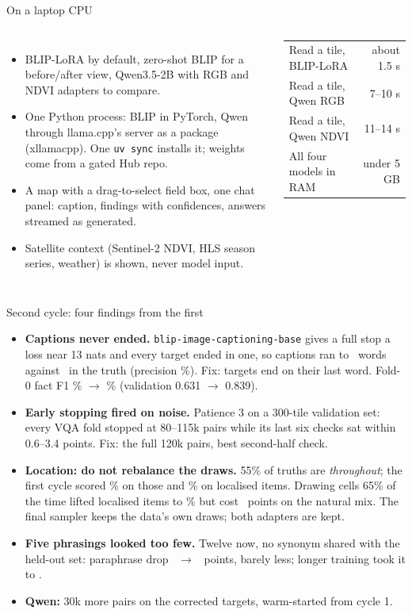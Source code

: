 \documentclass[aspectratio=169,10pt,t]{beamer}
\begin{document}
\begin{frame}{On a laptop CPU}
\begin{columns}[T]
\begin{itemize}
\item BLIP-LoRA by default, zero-shot BLIP for a before/after view, Qwen3.5-2B with RGB and NDVI adapters to compare.
\item One Python process: BLIP in PyTorch, Qwen through llama.cpp's server as a package (xllamacpp). One \texttt{uv sync} installs it; weights come from a gated Hub repo.
\item A map with a drag-to-select field box, one chat panel: caption, findings with confidences, answers streamed as generated.
\item Satellite context (Sentinel-2 NDVI, HLS season series, weather) is shown, never model input.
\end{itemize}
\small
\begin{tabular}{lr}
\toprule
Read a tile, BLIP-LoRA & about 1.5 s \\
Read a tile, Qwen RGB & 7--10 s \\
Read a tile, Qwen NDVI & 11--14 s \\
All four models in RAM & under 5 GB \\
\bottomrule
\end{tabular}
\end{columns}
\end{frame}

\begin{frame}{Second cycle: four findings from the first}
\begin{itemize}
\item \textbf{Captions never ended.} \texttt{blip-image-captioning-base} gives a full stop a loss near 13 nats and every target ended in one, so captions ran to \voneFoldWords\ words against \ in the truth (precision \voneFoldPrecision\%). Fix: targets end on their last word. Fold-0 fact F1 \voneFoldFactF\% $\to$ \blipFoldFactF\% (validation 0.631 $\to$ 0.839).
\item \textbf{Early stopping fired on noise.} Patience 3 on a 300-tile validation set: every VQA fold stopped at 80--115k pairs while its last six checks sat within 0.6--3.4 points. Fix: the full 120k pairs, best second-half check.
\item \textbf{Location: do not rebalance the draws.} 55\% of truths are \emph{throughout}; the first cycle scored \voneLocThroughout\% on those and \voneLocLocalised\% on localised items. Drawing cells 65\% of the time lifted localised items to \balLocLocalised\% but cost \balLocDrop\ points on the natural mix. The final sampler keeps the data's own draws; both adapters are kept.
\item \textbf{Five phrasings looked too few.} Twelve now, no synonym shared with the held-out set: paraphrase drop \voneParaphraseDrop\ $\to$ \vtwoParaphraseDrop\ points, barely less; longer training took it to \blipParaphraseDrop.
\item \textbf{Qwen:} 30k more pairs on the corrected targets, warm-started from cycle 1.
\end{itemize}
\end{frame}
\end{document}

